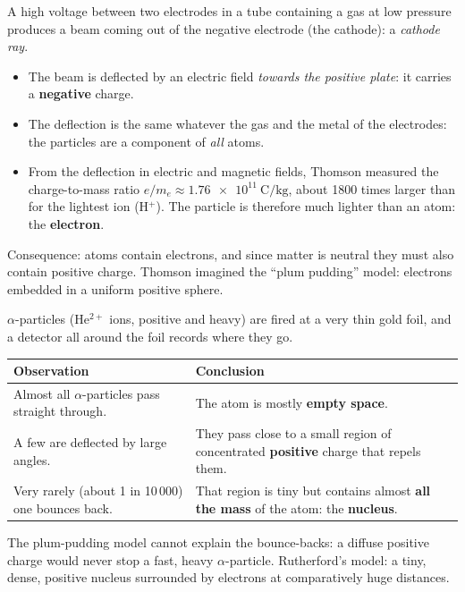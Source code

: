 A high voltage between two electrodes in a tube containing a gas at low pressure produces a beam
coming out of the negative electrode (the cathode): a \emph{cathode ray}.
\begin{itemize}
  \item The beam is deflected by an electric field \emph{towards the positive plate}: it carries a
        \textbf{negative} charge.
  \item The deflection is the same whatever the gas and the metal of the electrodes: the particles are
        a component of \emph{all} atoms.
  \item From the deflection in electric and magnetic fields, Thomson measured the charge-to-mass ratio
        $e/m_e \approx \SI{1.76e11}{\coulomb\per\kilo\gram}$, about 1800 times larger than for the lightest
        ion (H$^+$). The particle is therefore much lighter than an atom: the \textbf{electron}.
\end{itemize}
Consequence: atoms contain electrons, and since matter is neutral they must also contain positive
charge. Thomson imagined the ``plum pudding'' model: electrons embedded in a uniform positive sphere.

$\alpha$-particles (He$^{2+}$ ions, positive and heavy) are fired at a very thin gold foil, and a
detector all around the foil records where they go.
\begin{center}
\small
\begin{tabular}{@{}>{\raggedright\arraybackslash}p{62mm} >{\raggedright\arraybackslash}p{88mm}@{}}
\toprule
\textbf{Observation} & \textbf{Conclusion}\\ \midrule
Almost all $\alpha$-particles pass straight through. & The atom is mostly \textbf{empty space}.\\
A few are deflected by large angles. & They pass close to a small region of concentrated
\textbf{positive} charge that repels them.\\
Very rarely (about 1 in 10\,000) one bounces back. & That region is tiny but contains almost
\textbf{all the mass} of the atom: the \textbf{nucleus}.\\ \bottomrule
\end{tabular}
\end{center}
The plum-pudding model cannot explain the bounce-backs: a diffuse positive charge would never stop a
fast, heavy $\alpha$-particle. Rutherford's model: a tiny, dense, positive nucleus surrounded by
electrons at comparatively huge distances.

